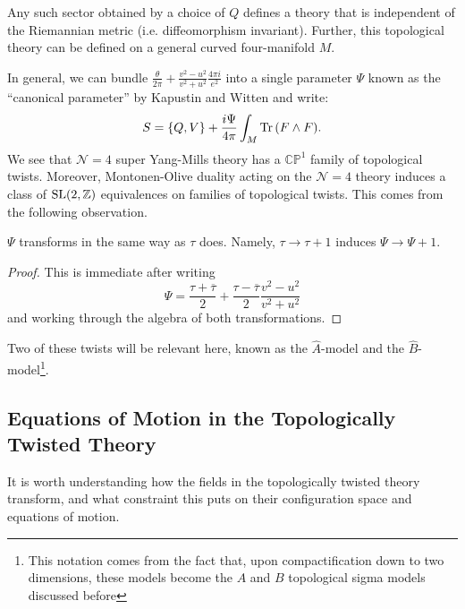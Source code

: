 	\begin{fact}
		Any such sector obtained by a choice of $Q$ defines a theory that is independent of the Riemannian metric (i.e. diffeomorphism invariant). Further, this topological theory can be defined on a general curved four-manifold $M$.
	\end{fact}
	
	In general, we can bundle $\frac{\theta}{2\pi} +  \frac{v^2-u^2}{v^2+u^2} \frac{4\pi i}{e^2}$ into a single parameter $\Psi$ known as the ``canonical parameter'' by Kapustin and Witten \cite{kapustin2006} and write:
	\[
		S = \{ Q, V\} + \frac{i \Psi}{4\pi} \int_M \mathrm{Tr}\, (F \wedge F).
	\]
	We see that $\mathcal N = 4$ super Yang-Mills theory has a $\mathbb{CP}^1$ family of topological twists. Moreover, Montonen-Olive duality acting on the $\mathcal N=4$ theory induces a class of $\mathrm{SL}(2, \mathbb{Z})$ equivalences on families of topological twists. This comes from the following observation. 
	\begin{obs}
		$\Psi$ transforms in the same way as $\tau$ does. Namely, $\tau \to \tau+1$ induces $\Psi \to \Psi + 1$.
	\end{obs}
	\begin{proof}
		This is immediate after writing
		\[
			\Psi = \frac{\tau + \overline \tau}{2} + \frac{\tau - \overline \tau}{2} \frac{v^2-u^2}{v^2+u^2}
		\]
		and working through the algebra of both transformations.
	\end{proof}
	
	\noindent Two of these twists will be relevant here, known as the $\hat A$-model and the $\hat B$-model\footnote{This notation comes from the fact that, upon compactification down to two dimensions, these models become the $A$ and $B$ topological sigma models discussed before}. %
	

\subsection{Equations of Motion in the Topologically Twisted Theory} %
\label{sub:equations_of_motion_in_the_topologically_twisted_theory}

	It is worth understanding how the fields in the topologically twisted theory transform, and what constraint this puts on their configuration space and equations of motion. 

